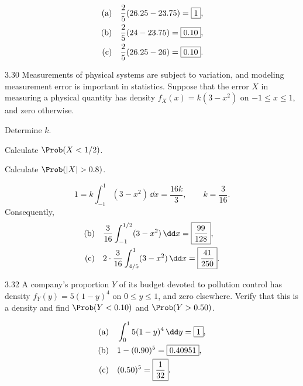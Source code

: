 \documentclass[11pt,oneside]{article}
\begin{document}
\begin{solution}
\begin{align*}
\textup{(a)}\quad&\frac25(26.25-23.75)=\boxed{1},\\
\textup{(b)}\quad&\frac25(24-23.75)=\boxed{0.10},\\
\textup{(c)}\quad&\frac25(26.25-26)=\boxed{0.10}.
\end{align*}
\end{solution}

\begin{exercise}{3.30}
Measurements of physical systems are subject to variation, and modeling measurement error is important in statistics. Suppose that the error $X$ in measuring a physical quantity has density $f_X(x)=k(3-x^2)$ on $-1\le x\le1$, and zero otherwise.
\begin{exercisesubparts}
\item Determine $k$.
\item Calculate $\Prob(X<1/2)$.
\item Calculate $\Prob(|X|>0.8)$.
\end{exercisesubparts}
\end{exercise}

\begin{solution}
\[
1=k\int_{-1}^1(3-x^2)\,\dd x=\frac{16k}{3},\qquad \boxed{k=\frac3{16}}.
\]
Consequently,
\begin{align*}
\textup{(b)}\quad&\frac3{16}\int_{-1}^{1/2}(3-x^2)\,\dd x=\boxed{\frac{99}{128}},\\
\textup{(c)}\quad&2\cdot\frac3{16}\int_{4/5}^{1}(3-x^2)\,\dd x=\boxed{\frac{41}{250}}.
\end{align*}
\end{solution}

\begin{exercise}{3.32}
A company's proportion $Y$ of its budget devoted to pollution control has density $f_Y(y)=5(1-y)^4$ on $0\le y\le1$, and zero elsewhere. Verify that this is a density and find $\Prob(Y<0.10)$ and $\Prob(Y>0.50)$.
\end{exercise}

\begin{solution}
\begin{align*}
\textup{(a)}\quad&\int_0^1 5(1-y)^4\,\dd y=\boxed{1},\\
\textup{(b)}\quad&1-(0.90)^5=\boxed{0.40951},\\
\textup{(c)}\quad&(0.50)^5=\boxed{\frac1{32}}.
\end{align*}
\end{solution}
\end{document}

